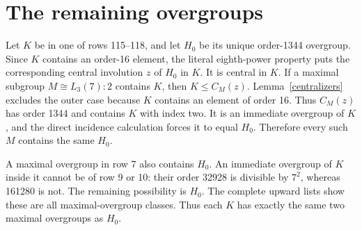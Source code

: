 \documentclass[11pt,a4paper]{article}
\begin{document}
\section{The remaining overgroups}

Let $K$ be in one of rows 115--118, and let $H_0$ be its unique
order-1344 overgroup. Since $K$ contains an order-16 element, the
literal eighth-power property puts the corresponding central
involution $z$ of $H_0$ in $K$. It is central in $K$.
If a maximal subgroup $M\cong L_3(7):2$ contains $K$, then
$K\leq C_M(z)$. Lemma~\ref{centralizers} excludes the outer case
because $K$ contains an element of order 16. Thus $C_M(z)$ has order
1344 and contains $K$ with index two. It is an immediate overgroup
of $K$, and the direct incidence calculation forces it to equal $H_0$.
Therefore every such $M$ contains the same $H_0$.

A maximal overgroup in row 7 also contains $H_0$. An immediate
overgroup of $K$ inside it cannot be of row 9 or 10: their order 32928
is divisible by $7^2$, whereas 161280 is not. The remaining possibility
is $H_0$. The complete upward lists show these are all maximal-overgroup
classes. Thus each $K$ has exactly the same two maximal overgroups as $H_0$.
\end{document}
